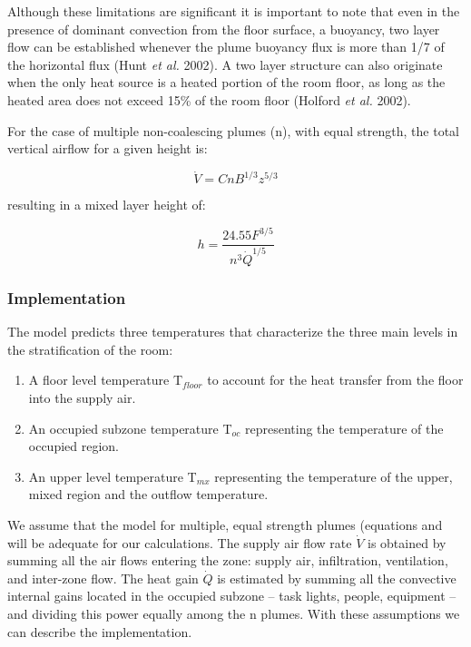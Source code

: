 Although these limitations are significant it is important to note that even in the presence of dominant convection from the floor surface, a buoyancy, two layer flow can be established whenever the plume buoyancy flux is more than 1/7 of the horizontal flux (Hunt \emph{et al.} 2002). A two layer structure can also originate when the only heat source is a heated portion of the room floor, as long as the heated area does not exceed 15\% of the room floor (Holford \emph{et al.} 2002).

For the case of multiple non-coalescing plumes (n), with equal strength, the total vertical airflow for a given height is:

\begin{equation}
  \dot{V} = CnB^{1/3}z^{5/3}
\end{equation}

resulting in a mixed layer height of:

\begin{equation}
  h = \frac{24.55F^{3/5}}{{n^3 \dot{Q}}^{1/5}}
\end{equation}

\subsubsection{Implementation}\label{implementation}

The model predicts three temperatures that characterize the three main levels in the stratification of the room:

\begin{enumerate}
\item A floor level temperature T\(_{floor}\) to account for the heat transfer from the floor into the supply air.
\item An occupied subzone temperature T\(_{oc}\) representing the temperature of the occupied region.
\item An upper level temperature T\(_{mx}\) representing the temperature of the upper, mixed region and the outflow temperature.
\end{enumerate}

We assume that the model for multiple, equal strength plumes (equations and will be adequate for our calculations. The supply air flow rate \(\dot V\) is obtained by summing all the air flows entering the zone: supply air, infiltration, ventilation, and inter-zone flow. The heat gain \(\dot Q\) is estimated by summing all the convective internal gains located in the occupied subzone -- task lights, people, equipment -- and dividing this power equally among the n plumes. With these assumptions we can describe the implementation.

